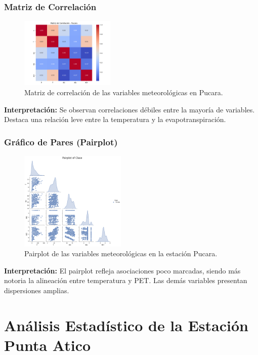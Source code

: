 \subsubsection*{Matriz de Correlación}
\begin{figure}[H]
\centering
\includegraphics[width=0.4\textwidth]{resultados/por_estacion_meteorologica/Pucara/matriz_correlacion.png}
\caption{Matriz de correlación de las variables meteorológicas en Pucara.}
\label{fig:pucara_corr}
\end{figure}
\textbf{Interpretación:} Se observan correlaciones débiles entre la mayoría de variables. Destaca una relación leve entre la temperatura y la evapotranspiración.

\subsubsection*{Gráfico de Pares (Pairplot)}
\begin{figure}[H]
\centering
\includegraphics[width=0.45\textwidth]{resultados/por_estacion_meteorologica/Pucara/pairplot.png}
\caption{Pairplot de las variables meteorológicas en la estación Pucara.}
\label{fig:pucara_pairplot}
\end{figure}
\textbf{Interpretación:} El pairplot refleja asociaciones poco marcadas, siendo más notoria la alineación entre temperatura y PET. Las demás variables presentan dispersiones amplias.


\section{Análisis Estadístico de la Estación Punta Atico}

